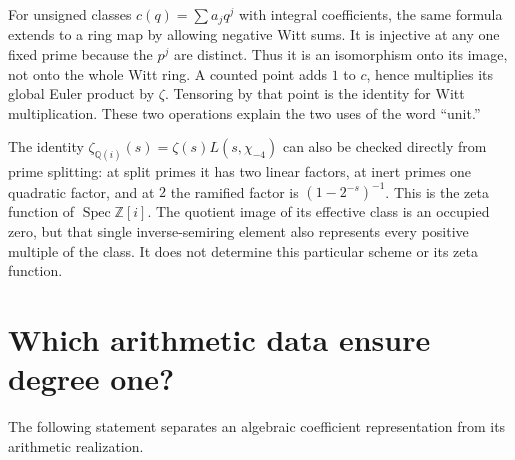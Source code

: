 \documentclass[11pt]{article}
\newcommand{\Z}{\mathbb Z}\newcommand{\N}{\mathbb N}\newcommand{\Q}{\mathbb Q}
\newcommand{\Spec}{\operatorname{Spec}}\newcommand{\tr}{\operatorname{tr}}
\theoremstyle{definition}\newtheorem{definition}[theorem]{Definition}
\begin{document}
For unsigned classes $c(q)=\sum a_jq^j$ with integral coefficients, the same formula extends to a ring map by allowing negative Witt sums. It is injective at any one fixed prime because the $p^j$ are distinct. Thus it is an isomorphism onto its image, not onto the whole Witt ring. A counted point adds $1$ to $c$, hence multiplies its global Euler product by $\zeta$. Tensoring by that point is the identity for Witt multiplication. These two operations explain the two uses of the word ``unit.''

The identity $\zeta_{\Q(i)}(s)=\zeta(s)L(s,\chi_{-4})$ can also be checked directly from prime splitting: at split primes it has two linear factors, at inert primes one quadratic factor, and at $2$ the ramified factor is $(1-2^{-s})^{-1}$. This is the zeta function of $\Spec\Z[i]$. The quotient image of its effective class is an occupied zero, but that single inverse-semiring element also represents every positive multiple of the class. It does not determine this particular scheme or its zeta function.

\section{Which arithmetic data ensure degree one?}\label{sec:degree}
The following statement separates an algebraic coefficient representation from its arithmetic realization.
\end{document}
